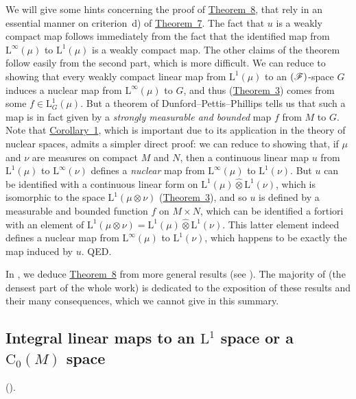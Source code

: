 \documentclass{article}
\theoremstyle{plain}
\newcommand{\LL}{\mathrm{L}}
\newcommand{\CC}{\mathrm{C}}
\newcommand{\FF}{\mbox{\normalfont($\mathscr{F}$)}}
\newcommand{\hotimes}{\widehat{\otimes}}
\newcommand{\oldpage}[1]{\marginpar{\footnotesize$\Big\vert$ \textit{p.~#1}}}
\begin{document}
{  We will give some hints concerning the proof of \hyperref[1.theorem8]{Theorem~8}, that rely in an essential manner on criterion~d) of \hyperref[1.theorem7]{Theorem~7}.
  The fact that $u$ is a weakly compact map follows immediately from the fact that the identified map from $\LL^\infty(\mu)$ to $\LL^1(\mu)$ is a weakly compact map.
  The other claims of the theorem follow easily from the second part, which is more difficult.
  We can reduce to showing that every weakly compact linear map from $\LL^1(\mu)$ to an $\FF$-space $G$ induces a nuclear map from $\LL^\infty(\mu)$ to $G$, and thus (\hyperref[1.theorem3]{Theorem~3}) comes from some $f\in\LL^1_G(\mu)$.
  But a theorem of Dunford--Pettis--Phillips tells us that such a map is in fact given by a \emph{strongly measurable and bounded} map $f$ from $M$ to $G$.
  Note that \hyperref[1.corollary1]{Corollary~1}, which is important due to its application in the theory of nuclear spaces, admits a simpler direct proof:
  we can reduce to showing that, if $\mu$ and $\nu$ are measures on compact $M$ and $N$, then a continuous linear map $u$ from $\LL^1(\mu)$ to $\LL^\infty(\nu)$ defines a \emph{nuclear} map from $\LL^\infty(\mu)$ to $\LL^1(\nu)$.
  But $u$ can be identified with a continuous linear form on $\LL^1(\mu)\hotimes\LL^1(\nu)$, which is isomorphic to the space $\LL^1(\mu\otimes\nu)$ (\hyperref[1.theorem3]{Theorem~3}), and so $u$ is defined
\oldpage{91}
  by a measurable and bounded function $f$ on $M\times N$, which can be identified a fortiori with an element of $\LL^1(\mu\otimes\nu)=\LL^1(\mu)\hotimes\LL^1(\nu)$.
  This latter element indeed defines a nuclear map from $\LL^\infty(\mu)$ to $\LL^1(\nu)$, which happens to be exactly the map induced by $u$.
  QED.

  In \cite{PTT}, we deduce \hyperref[1.theorem8]{Theorem~8} from more general results (see \cite[chap.~1, \S4, n\textsuperscript{o}~2]{PTT}).
  The majority of \cite[chap.~1, \S4]{PTT} (the densest part of the whole work) is dedicated to the exposition of these results and their many consequences, which we cannot give in this summary.
}


\subsection{Integral linear maps to an \texorpdfstring{$\LL^1$}{L1} space or a \texorpdfstring{$\CC_0(M)$}{C0(M)} space}
\label{1.9}

(\cite[chap.~1, \S4, n\textsuperscript{o}~4]{PTT}).
\medskip
\end{document}
